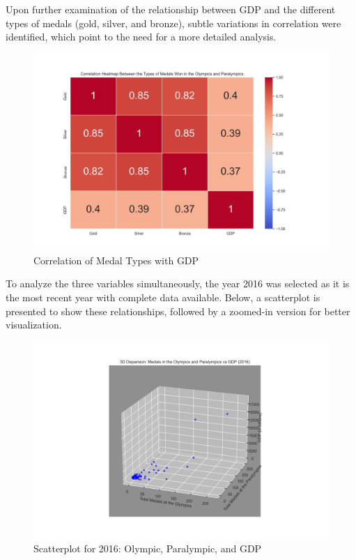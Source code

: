 \documentclass{article}
\begin{document}
Upon further examination of the relationship between GDP and the different types of medals (gold, silver, and bronze), subtle variations in correlation were identified, which point to the need for a more detailed analysis.

\begin{figure}[H]
    \centering
    \includegraphics[width=0.6\linewidth]{images/gdp_analysis/heatmap_medals_categories_gdp.png}
    \caption{Correlation of Medal Types with GDP}
    \label{fig:medal_types_gdp_corr}
\end{figure}

To analyze the three variables simultaneously, the year 2016 was selected as it is the most recent year with complete data available. Below, a scatterplot is presented to show these relationships, followed by a zoomed-in version for better visualization.

\begin{figure}[H]
    \centering
    \includegraphics[width=\linewidth]{images/gdp_analysis/scatterplot_olympics_paralympics_pib_2016.png}
    \caption{Scatterplot for 2016: Olympic, Paralympic, and GDP}
    \label{fig:scatterplot_full}
\end{figure}
\end{document}
